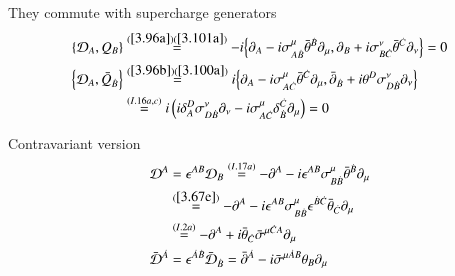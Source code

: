 They commute with supercharge generators
\begin{subequations}
\label{3.102}   
\begin{align}
   \acomm{\D_A}{Q_B} & \stackrel{(\ref{3.96a})(\ref{3.101a})}{=} -i \acomm{\partial_A - i \sigma^\mu_{A\dot{B}} \bar\theta^{\dot{B}}\partial_\mu}{\partial_B + i\sigma^\nu_{B\dot{C}}\bar\theta^{\dot{C}}\partial_\nu} = 0 \label{3.102a} \\
         \acomm{\D_A}{\bar{Q}_{\dot{B}}} &\stackrel{(\ref{3.96b}) (\ref{3.100a})}{=} i \acomm{\partial_A - i \sigma^\mu_{A\dot{C}}\bar\theta^{\dot{C}}\partial_\mu}{\bar\partial_{\dot{B}} + i\theta^D \sigma^\nu_{D\dot{B}} \partial_\nu} \notag \\
                                      & \stackrel{(I.16a,c)}{=} i \left( i\delta^D_A\sigma^\nu_{D\dot{B}} \partial_\nu - i \sigma^\mu_{A\dot{C}} \delta^{\dot{C}}_{\dot{B}} \partial_\mu \right) = 0\label{3.102b}
\end{align}
\end{subequations}

Contravariant version
\begin{subequations}
   \label{3.103}
\begin{align}
   \mathcal{D}^A &= \epsilon^{AB}\mathcal{D}_B \stackrel{(I.17a)}{=} - \partial^A - i \epsilon^{AB} \sigma^{\mu}_{B\dot{B}} \bar\theta^{\dot{B}} \partial_\mu \notag \\
           & \stackrel{(\ref{3.67e})}{=} -\partial^A - i \epsilon^{AB} \sigma^\mu_{B\dot{B}} \epsilon^{\dot{B} \dot{C}}\bar{\theta}_{\dot{C}}\partial_\mu \notag \\
           & \stackrel{(I.2a)}{=} -\partial^A + i \bar\theta_{\dot{C}} \bar\sigma^{\mu \dot{C}A}\partial_\mu \label{3.103a} \\
         \bar{\mathcal{D}}^{\dot{A}} &= \epsilon^{\dot{A}\dot{B}}\bar{\mathcal{D}}_{\dot{B}} = \bar\partial^{\dot{A}} - i\bar\sigma^{\mu \dot{A} B} \theta_B \partial_\mu \label{3.103b}
\end{align}
\end{subequations}


